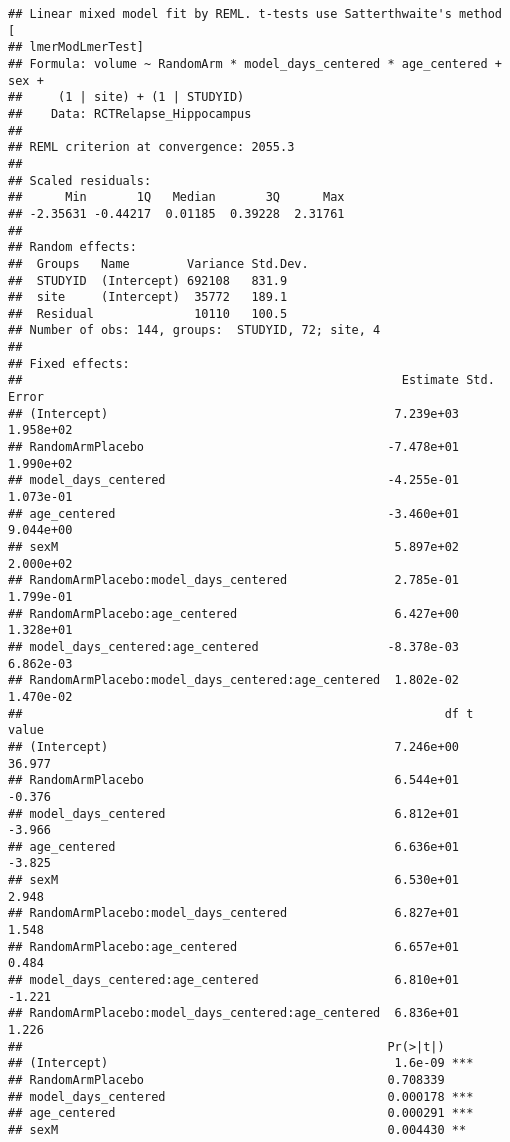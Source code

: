 \documentclass[]{article}
\theoremstyle{definition}
\theoremstyle{definition}
\theoremstyle{definition}
\theoremstyle{remark}
\begin{document}
\begin{verbatim}
## Linear mixed model fit by REML. t-tests use Satterthwaite's method [
## lmerModLmerTest]
## Formula: volume ~ RandomArm * model_days_centered * age_centered + sex +  
##     (1 | site) + (1 | STUDYID)
##    Data: RCTRelapse_Hippocampus
## 
## REML criterion at convergence: 2055.3
## 
## Scaled residuals: 
##      Min       1Q   Median       3Q      Max 
## -2.35631 -0.44217  0.01185  0.39228  2.31761 
## 
## Random effects:
##  Groups   Name        Variance Std.Dev.
##  STUDYID  (Intercept) 692108   831.9   
##  site     (Intercept)  35772   189.1   
##  Residual              10110   100.5   
## Number of obs: 144, groups:  STUDYID, 72; site, 4
## 
## Fixed effects:
##                                                     Estimate Std. Error
## (Intercept)                                        7.239e+03  1.958e+02
## RandomArmPlacebo                                  -7.478e+01  1.990e+02
## model_days_centered                               -4.255e-01  1.073e-01
## age_centered                                      -3.460e+01  9.044e+00
## sexM                                               5.897e+02  2.000e+02
## RandomArmPlacebo:model_days_centered               2.785e-01  1.799e-01
## RandomArmPlacebo:age_centered                      6.427e+00  1.328e+01
## model_days_centered:age_centered                  -8.378e-03  6.862e-03
## RandomArmPlacebo:model_days_centered:age_centered  1.802e-02  1.470e-02
##                                                           df t value
## (Intercept)                                        7.246e+00  36.977
## RandomArmPlacebo                                   6.544e+01  -0.376
## model_days_centered                                6.812e+01  -3.966
## age_centered                                       6.636e+01  -3.825
## sexM                                               6.530e+01   2.948
## RandomArmPlacebo:model_days_centered               6.827e+01   1.548
## RandomArmPlacebo:age_centered                      6.657e+01   0.484
## model_days_centered:age_centered                   6.810e+01  -1.221
## RandomArmPlacebo:model_days_centered:age_centered  6.836e+01   1.226
##                                                   Pr(>|t|)    
## (Intercept)                                        1.6e-09 ***
## RandomArmPlacebo                                  0.708339    
## model_days_centered                               0.000178 ***
## age_centered                                      0.000291 ***
## sexM                                              0.004430 ** 

\end{verbatim}
\end{document}

